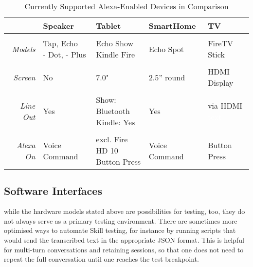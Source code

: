 \begin{table}[htbp!]
	\caption[Alexa Devices in Comparision]{Currently Supported Alexa-Enabled Devices in Comparison}\label{alexaDeviceTable}
	\begin{tabularx}{\textwidth}{  r | l l l l  }
		
				& Speaker							& Tablet	& SmartHome	& TV	\\ \hline \hline \\
		\textit{Models}	& \shortstack[l]{Tap, Echo \\ - Dot, - Plus}     & \shortstack[l]{Echo Show \\ Kindle Fire}    & Echo Spot & FireTV Stick \\ \hline \\
		\textit{Screen}  		& No      & 7.0" 		& 2.5'' round				&  HDMI Display      \\ \hline \\
		\textit{Line Out}		& Yes      					        & \shortstack[l]{Show: Bluetooth \\ Kindle: Yes} & 	Yes & \shortstack{via HDMI \\ \textcolor{white}{text} }      \\ \hline \\
		\textit{Alexa On} 	& Voice	Command					&
		\shortstack[l]{excl. Fire HD 10\\Button Press}
		& Voice Command & %
		Button Press
	\end{tabularx}
\end{table}





\subsection*{Software Interfaces}



while the hardware models stated above are possibilities for testing, too, they do not always serve as a primary testing environment. There are sometimes more optimised ways to automate Skill testing, for instance by running scripts that would send the transcribed text in the appropriate JSON format. This is helpful for multi-turn conversations and retaining sessions, so that one does not need to repeat the full conversation until one reaches the test breakpoint.

